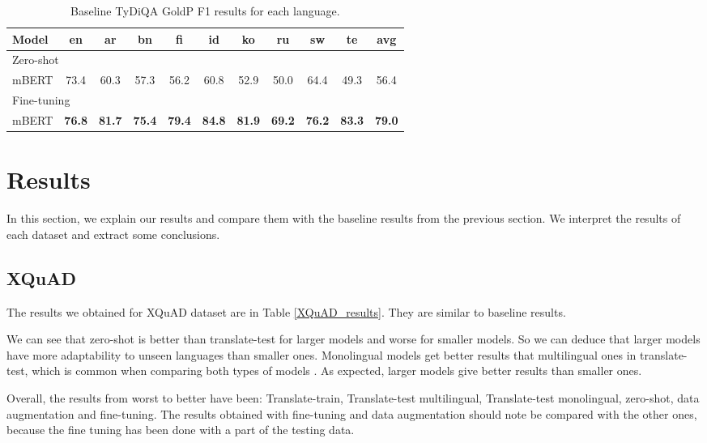 \documentclass[11pt]{article}
\begin{document}
\begin{table}[!ht]
    \centering
    \begin{adjustbox}{max width=\columnwidth}
    \begin{tabular}{l|ccccccccc|c}
        \toprule
        Model & en & ar & bn & fi & id & ko & ru & sw & te & avg \\
        \midrule
        \multicolumn{11}{l}{Zero-shot} \\
        \midrule
        mBERT & 73.4 & 60.3 & 57.3 & 56.2 & 60.8 & 52.9 & 50.0 & 64.4 & 49.3 & 56.4  \\ \midrule
        \multicolumn{11}{l}{Fine-tuning} \\
        \midrule
        mBERT & \textbf{76.8} & \textbf{81.7} & \textbf{75.4} & \textbf{79.4} & \textbf{84.8} & \textbf{81.9} & \textbf{69.2} & \textbf{76.2} & \textbf{83.3} & \textbf{79.0}  \\
        \bottomrule
    \end{tabular}
    \end{adjustbox}
    \centering
    \caption{Baseline TyDiQA GoldP F1 results for each language.}
    \label{TyDiQA_baseline_results}
\end{table}

\section{Results}

In this section, we explain our results and compare them with the baseline results from the previous section. We interpret the results of each dataset and extract some conclusions.

\subsection{XQuAD}

The results we obtained for XQuAD dataset are in Table \ref{XQuAD_results}. They are similar to baseline results.

We can see that zero-shot is better than translate-test for larger models and worse for smaller models. So we can deduce that larger models have more adaptability to unseen languages than smaller ones. Monolingual models get better results that multilingual ones in translate-test, which is common when comparing both types of models . As expected, larger models give better results than smaller ones.

Overall, the results from worst to better have been: Translate-train, Translate-test multilingual, Translate-test monolingual, zero-shot, data augmentation and fine-tuning. The results obtained with fine-tuning and data augmentation should note be compared with the other ones, because the fine tuning has been done with a part of the testing data.
\end{document}
